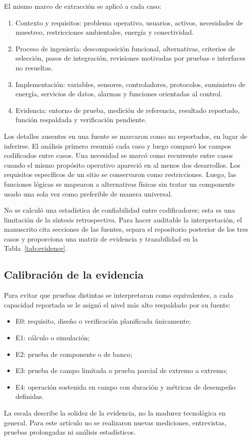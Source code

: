 \documentclass[conference]{IEEEtran}
\begin{document}
El mismo marco de extracción se aplicó a cada caso:
\begin{enumerate}
\item Contexto y requisitos: problema operativo, usuarios, activos, necesidades de muestreo, restricciones ambientales, energía y conectividad.
\item Proceso de ingeniería: descomposición funcional, alternativas, criterios de selección, pasos de integración, revisiones motivadas por pruebas e interfaces no resueltas.
\item Implementación: variables, sensores, controladores, protocolos, suministro de energía, servicios de datos, alarmas y funciones orientadas al control.
\item Evidencia: entorno de prueba, medición de referencia, resultado reportado, función respaldada y verificación pendiente.
\end{enumerate}
Los detalles ausentes en una fuente se marcaron como no reportados, en lugar de inferirse. El análisis primero resumió cada caso y luego comparó los campos codificados entre casos. Una necesidad se marcó como recurrente entre casos cuando el mismo propósito operativo apareció en al menos dos desarrollos. Los requisitos específicos de un sitio se conservaron como restricciones. Luego, las funciones lógicas se mapearon a alternativas físicas sin tratar un componente usado una sola vez como preferible de manera universal.

No se calculó una estadística de confiabilidad entre codificadores; esta es una limitación de la síntesis retrospectiva. Para hacer auditable la interpretación, el manuscrito cita secciones de las fuentes, separa el repositorio posterior de los tres casos y proporciona una matriz de evidencia y trazabilidad en la Tabla~\ref{tab:evidence}.

\subsection{Calibración de la evidencia}

Para evitar que pruebas distintas se interpretaran como equivalentes, a cada capacidad reportada se le asignó el nivel más alto respaldado por su fuente:
\begin{itemize}
\item E0: requisito, diseño o verificación planificada únicamente;
\item E1: cálculo o simulación;
\item E2: prueba de componente o de banco;
\item E3: prueba de campo limitada o prueba parcial de extremo a extremo;
\item E4: operación sostenida en campo con duración y métricas de desempeño definidas.
\end{itemize}
La escala describe la solidez de la evidencia, no la madurez tecnológica en general. Para este artículo no se realizaron nuevas mediciones, entrevistas, pruebas prolongadas ni análisis estadísticos.
\end{document}
